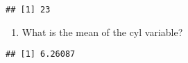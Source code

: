 \documentclass[]{article}
\newenvironment{Shaded}{\begin{snugshade}}{\end{snugshade}}
\newcommand{\KeywordTok}[1]{\textcolor[rgb]{0.13,0.29,0.53}{\textbf{{#1}}}}
\newcommand{\DataTypeTok}[1]{\textcolor[rgb]{0.13,0.29,0.53}{{#1}}}
\newcommand{\OtherTok}[1]{\textcolor[rgb]{0.56,0.35,0.01}{{#1}}}
\newcommand{\NormalTok}[1]{{#1}}
\begin{document}
\begin{verbatim}
## [1] 23
\end{verbatim}

\begin{enumerate}
\def\labelenumi{\arabic{enumi}.}
\setcounter{enumi}{7}
\itemsep1pt\parskip0pt
\item
  What is the mean of the cyl variable?
\end{enumerate}

\begin{Shaded}
\end{Shaded}

\begin{verbatim}
## [1] 6.26087
\end{verbatim}
\end{document}
